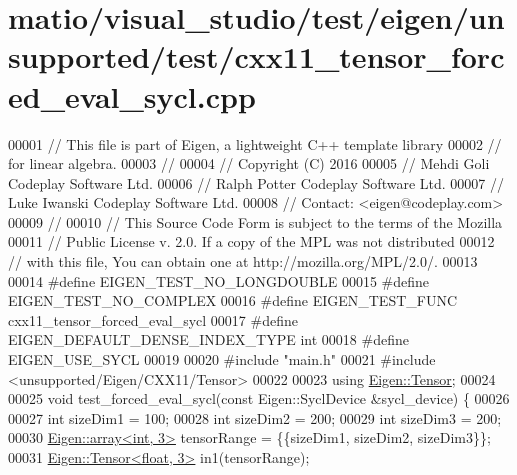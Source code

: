 \hypertarget{matio_2visual__studio_2test_2eigen_2unsupported_2test_2cxx11__tensor__forced__eval__sycl_8cpp_source}{}\section{matio/visual\+\_\+studio/test/eigen/unsupported/test/cxx11\+\_\+tensor\+\_\+forced\+\_\+eval\+\_\+sycl.cpp}
\label{matio_2visual__studio_2test_2eigen_2unsupported_2test_2cxx11__tensor__forced__eval__sycl_8cpp_source}

\begin{DoxyCode}
00001 \textcolor{comment}{// This file is part of Eigen, a lightweight C++ template library}
00002 \textcolor{comment}{// for linear algebra.}
00003 \textcolor{comment}{//}
00004 \textcolor{comment}{// Copyright (C) 2016}
00005 \textcolor{comment}{// Mehdi Goli    Codeplay Software Ltd.}
00006 \textcolor{comment}{// Ralph Potter  Codeplay Software Ltd.}
00007 \textcolor{comment}{// Luke Iwanski  Codeplay Software Ltd.}
00008 \textcolor{comment}{// Contact: <eigen@codeplay.com>}
00009 \textcolor{comment}{//}
00010 \textcolor{comment}{// This Source Code Form is subject to the terms of the Mozilla}
00011 \textcolor{comment}{// Public License v. 2.0. If a copy of the MPL was not distributed}
00012 \textcolor{comment}{// with this file, You can obtain one at http://mozilla.org/MPL/2.0/.}
00013 
00014 \textcolor{preprocessor}{#define EIGEN\_TEST\_NO\_LONGDOUBLE}
00015 \textcolor{preprocessor}{#define EIGEN\_TEST\_NO\_COMPLEX}
00016 \textcolor{preprocessor}{#define EIGEN\_TEST\_FUNC cxx11\_tensor\_forced\_eval\_sycl}
00017 \textcolor{preprocessor}{#define EIGEN\_DEFAULT\_DENSE\_INDEX\_TYPE int}
00018 \textcolor{preprocessor}{#define EIGEN\_USE\_SYCL}
00019 
00020 \textcolor{preprocessor}{#include "main.h"}
00021 \textcolor{preprocessor}{#include <unsupported/Eigen/CXX11/Tensor>}
00022 
00023 \textcolor{keyword}{using} \hyperlink{class_eigen_1_1_tensor}{Eigen::Tensor};
00024 
00025 \textcolor{keywordtype}{void} test\_forced\_eval\_sycl(\textcolor{keyword}{const} Eigen::SyclDevice &sycl\_device) \{
00026 
00027   \textcolor{keywordtype}{int} sizeDim1 = 100;
00028   \textcolor{keywordtype}{int} sizeDim2 = 200;
00029   \textcolor{keywordtype}{int} sizeDim3 = 200;
00030   \hyperlink{class_eigen_1_1array}{Eigen::array<int, 3>} tensorRange = \{\{sizeDim1, sizeDim2, sizeDim3\}\};
00031   \hyperlink{class_eigen_1_1_tensor}{Eigen::Tensor<float, 3>} in1(tensorRange);

\end{DoxyCode}
